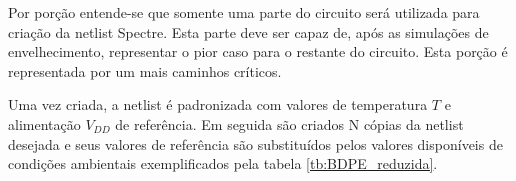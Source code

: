 Por porção entende-se que somente uma parte do circuito será utilizada para criação da netlist Spectre. Esta parte deve ser capaz de, após as simulações de envelhecimento, representar o pior caso para o restante do circuito. Esta porção é representada por um mais caminhos críticos.

Uma vez criada, a netlist é padronizada com valores de temperatura $T$ e alimentação $V_{DD}$ de referência. Em seguida são criados N cópias da netlist desejada e seus valores de referência são substituídos pelos valores disponíveis de condições ambientais exemplificados pela tabela \ref{tb:BDPE_reduzida}.
\begin{figure}[H]
\center
{}
\hfill
{}
\hfill
{}
\hfill
{}
\end{figure}
